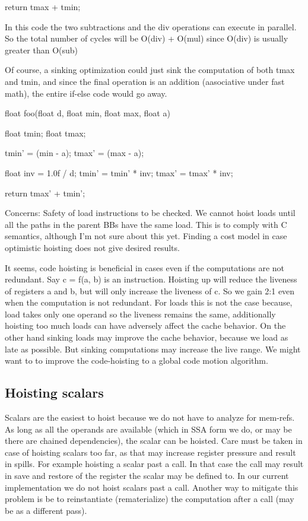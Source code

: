 \begin{section}
\begin{program}
{  return tmax + tmin;
}

\end{program}

In this code the two subtractions and the div operations can execute in parallel. So the total number of cycles will be
O(div) + O(mul)
since O(div) is usually greater than O(sub)

Of course, a sinking optimization could just sink the computation of both tmax and tmin, and since the final operation is an addition (aasociative under fast math), the entire if-else
code would go away.

\begin{program}
float foo(float d, float min, float max, float a)
{
  float tmin;
  float tmax;

  tmin' = (min - a);
  tmax' = (max - a);

  float inv = 1.0f / d;
  tmin' = tmin' * inv;
  tmax' = tmax' * inv;

  return tmax' + tmin';
}
\end{program}


 Concerns:
 Safety of load instructions to be checked. We cannot hoist loads until all the paths in the parent BBs have the same load. This is to comply with C semantics, although I'm not sure about this yet.
 Finding a cost model in case optimistic hoisting does not give desired results.

It seems, code hoisting is beneficial in cases even if the computations are not redundant.
Say c = f(a, b) is an instruction. Hoisting up will reduce the liveness of registers a and b, but will only increase the liveness of c. So we gain 2:1 even when the computation is not redundant. For loads this is not the case because, load takes only one operand so the liveness remains the same, additionally hoisting too much loads can have adversely affect the cache behavior.
On the other hand sinking loads may improve the cache behavior, because we load as late as possible. But sinking computations may increase the live range.
We might want to to improve the code-hoisting to a global code motion algorithm.

\section{Hoisting scalars}
Scalars are the easiest to hoist because we do not have to analyze for mem-refs. As long as all the
operands are available (which in SSA form we do, or may be there are chained dependencies), the scalar can
be hoisted. Care must be taken in case of hoisting scalars too far, as that may increase register pressure
and result in spills. For example hoisting a scalar past a call. In that case the call may result in
save and restore of the register the scalar may be defined to. In our current implementation
we do not hoist scalars past a call. Another way to mitigate this problem is be to
reinstantiate (rematerialize) the computation after a call (may be as a different pass).


\end{section}
